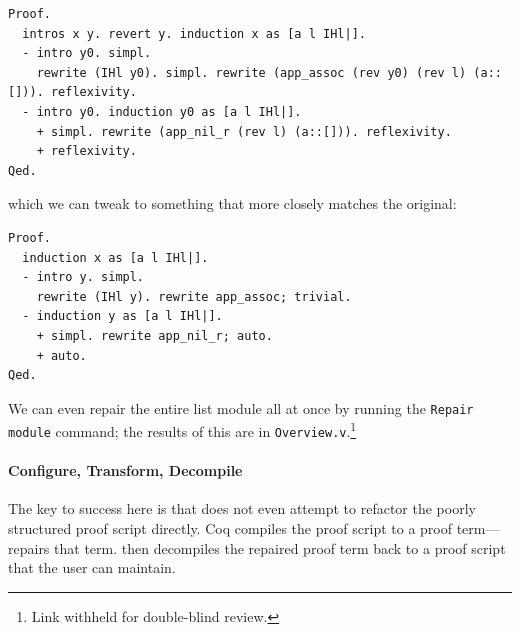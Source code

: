 \begin{lstlisting}
Proof.
  intros x y. revert y. induction x as [a l IHl|].
  - intro y0. simpl.
    rewrite (IHl y0). simpl. rewrite (app_assoc (rev y0) (rev l) (a::[])). reflexivity.
  - intro y0. induction y0 as [a l IHl|].
    + simpl. rewrite (app_nil_r (rev l) (a::[])). reflexivity.
    + reflexivity.
Qed.
\end{lstlisting}
which we can tweak to something that more closely matches the original:

\begin{lstlisting}
Proof.
  induction x as [a l IHl|].
  - intro y. simpl.
    rewrite (IHl y). rewrite app_assoc; trivial.
  - induction y as [a l IHl|].
    + simpl. rewrite app_nil_r; auto.
    + auto.
Qed.
\end{lstlisting}
We can even repair the entire list module all at once by running the \lstinline{Repair module}
command; the results of this are in \lstinline{Overview.v}.\footnote{Link withheld for double-blind review.} %

\paragraph{Configure, Transform, Decompile}
The key to success here is that \toolname does not even attempt to refactor the poorly structured proof script directly.
Coq compiles the proof script to a proof term---\toolname repairs that term.
\toolname then decompiles the repaired proof term back to a proof script that the user can maintain.

